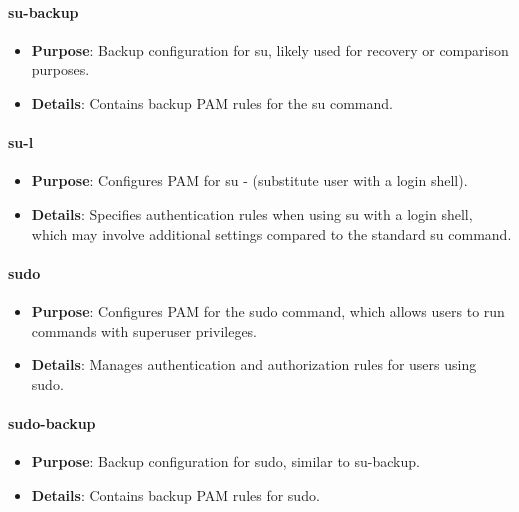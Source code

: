 \documentclass{article}
\begin{document}
\paragraph{su-backup}

\begin{itemize}
    \item \textbf{Purpose}: Backup configuration for su, likely used for recovery or comparison purposes.
    \item \textbf{Details}: Contains backup PAM rules for the su command.
\end{itemize}

\paragraph{su-l}

\begin{itemize}
    \item \textbf{Purpose}: Configures PAM for su - (substitute user with a login shell).
    \item \textbf{Details}: Specifies authentication rules when using su with a login shell, which may involve additional settings compared to the standard su command.
\end{itemize}

\paragraph{sudo}

\begin{itemize}
    \item \textbf{Purpose}: Configures PAM for the sudo command, which allows users to run commands with superuser privileges.
    \item \textbf{Details}: Manages authentication and authorization rules for users using sudo.
\end{itemize}

\paragraph{sudo-backup}

\begin{itemize}
    \item \textbf{Purpose}: Backup configuration for sudo, similar to su-backup.
    \item \textbf{Details}: Contains backup PAM rules for sudo.
\end{itemize}
\end{document}
